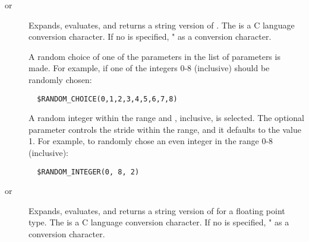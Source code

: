 \begin{description}
\item [
       or ]
Expands, evaluates, and returns a string version of 
.
The  is a C language conversion character.
If no  is specified, \verb@"%d"@ is used
as a conversion character.

\item []
A random choice of one of the parameters in the list of parameters is made.
For example,
if one of the integers 0-8 (inclusive) should be randomly
chosen:
\begin{verbatim}
  $RANDOM_CHOICE(0,1,2,3,4,5,6,7,8)
\end{verbatim}

\item []
A random integer within the range \verb@min@ and \verb@max@, inclusive,
is selected.
The optional \verb@step@ parameter
controls the stride within the range, and it defaults to the value 1.
For example, to randomly chose an even integer in the range 0-8 (inclusive):
\begin{verbatim}
  $RANDOM_INTEGER(0, 8, 2)
\end{verbatim}

\item [
       or ]
Expands, evaluates, and returns a string version of 
 for a floating point type.
The  is a C language conversion character.
If no  is specified, \verb@"%16G"@ is used
as a conversion character.

\item []

\end{description}
